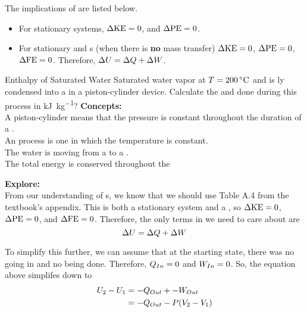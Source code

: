 The implications of  are listed below.
\begin{itemize}[noitemsep]
\item For stationary systems, $\Delta \mathrm{KE} = 0$, and $\Delta \mathrm{PE} = 0$.
\item For stationary and s (when there is \textbf{no} mass transfer) $\Delta \mathrm{KE} = 0$, $\Delta \mathrm{PE} = 0$, $\Delta \mathrm{FE} = 0$.
  Therefore, $\Delta U = \Delta Q + \Delta W$.
\end{itemize}

\begin{example}{Enthalpy of Saturated Water}
  Saturated water vapor at $\Temp = \SI{200}{\degreeCelsius}$ and is ly condensed into a  in a piston-cylinder device.
  Calculate the  and  done during this process in \si{\kilo\joule\per\kilo\gram}?
  \tcblower{}
  \textbf{Concepts:} \\
  A piston-cylinder means that the pressure is constant throughout the duration of a . \\
  An  process is one in which the temperature is constant. \\
  The water is moving from a  to a . \\
  The total energy is conserved throughout the 

  \textbf{Explore:} \\
  From our understanding of s, we know that we should use Table A.4 from the textbook's appendix.
  This is both a stationary system and a , so $\Delta \mathrm{KE} = 0$, $\Delta \mathrm{PE} = 0$, and $\Delta \mathrm{FE} = 0$.
  Therefore, the only terms in  we need to care about are
  \begin{equation*}
    \Delta U = \Delta Q + \Delta W
  \end{equation*}

  To simplify this further, we can assume that at the starting state, there was no  going in and no  being done.
  Therefore, $Q_{In} = 0$ and $W_{In} = 0$.
  So, the equation above simplifes down to
  \begin{align*}
    U_{2} - U_{1} &= -Q_{Out} + -W_{Out} \\
                                              &= -Q_{Out} - P(V_{2} - V_{1})
  \end{align*}


\end{example}
